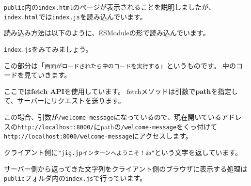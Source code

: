 \texttt{public}内の\texttt{index.html}のページが表示されることを説明しましたが、\texttt{index.html}では\texttt{index.js}を読み込んでいます。

読み込み方法は以下のように、ESModuleの形で読み込んでいます。

\begin{Shaded}
\begin{Highlighting}[]
\DataTypeTok{\textless{}}\OperatorTok{=}\DataTypeTok{\textgreater{}\textless{}/}\DataTypeTok{\textgreater{}}
\end{Highlighting}
\end{Shaded}

\texttt{index.js}をみてみましょう。

\begin{Shaded}
\begin{Highlighting}[]
 \OperatorTok{=} \NormalTok{ () }\KeywordTok{=\textgreater{}}\NormalTok{ \{}
\NormalTok{\}}\OperatorTok{;}
\end{Highlighting}
\end{Shaded}

この部分は「\texttt{画面がロードされたら中のコードを実行する}」というものです。
中のコードを見ていきます。

\begin{Shaded}
\begin{Highlighting}[]
\OperatorTok{=}  \NormalTok{(}\NormalTok{)}\OperatorTok{;}
\end{Highlighting}
\end{Shaded}

ここでは\textbf{fetch API}を使用しています。
fetchメソッドは引数で\textbf{path}を指定して、サーバーにリクエストを送ります。

この場合、引数が\texttt{/welcome-message}になっているので、現在開いているアドレスの\texttt{http://localhost:8000/}にpathの\texttt{/welcome-message}をくっ付けて\texttt{http://localhost:8000/welcome-message}にアクセスします。

クライアント側に\texttt{"jig.jpインターンへようこそ！👍"}という文字を返しています。

サーバー側から返ってきた文字列をクライアント側のブラウザに表示する処理は\texttt{public}フォルダ内の\texttt{index.js}で行っています。

